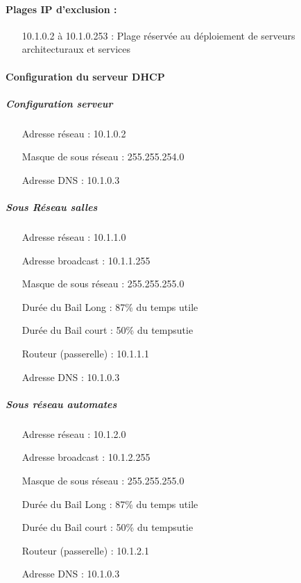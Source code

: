\documentclass[a4paper]{article}
\begin{document}
\paragraph{Plages IP d'exclusion :}
\begin{itemize}
\item[10.1.0.2 à 10.1.0.253] : Plage réservée au déploiement de serveurs architecturaux et services
\end{itemize}

\paragraph{Configuration du serveur DHCP}

\subparagraph{Configuration serveur}
\begin{itemize}
\item[Adresse réseau]: 10.1.0.2
\item[Masque de sous réseau]: 255.255.254.0
\item[Adresse DNS]: 10.1.0.3
\end{itemize}

\subparagraph{Sous Réseau salles}
\begin{itemize}
\item[Adresse réseau]: 10.1.1.0
\item[Adresse broadcast]: 10.1.1.255
\item[Masque de sous réseau]: 255.255.255.0
\item[Durée du Bail Long]: 87\% du temps utile
\item[Durée du Bail court]: 50\% du tempsutie
\item[Routeur (passerelle)]: 10.1.1.1
\item[Adresse DNS]: 10.1.0.3
\end{itemize}

\subparagraph{Sous réseau automates}
\begin{itemize}
\item[Adresse réseau]: 10.1.2.0
\item[Adresse broadcast]: 10.1.2.255
\item[Masque de sous réseau]: 255.255.255.0
\item[Durée du Bail Long]: 87\% du temps utile
\item[Durée du Bail court]: 50\% du tempsutie
\item[Routeur (passerelle)]: 10.1.2.1
\item[Adresse DNS]: 10.1.0.3
\end{itemize}
\end{document}

